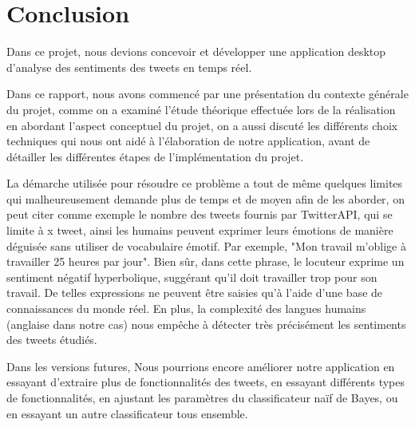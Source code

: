 \chapter{Conclusion}
Dans ce projet, nous devions concevoir et développer une application desktop d'analyse des sentiments des tweets en temps réel.

Dans ce rapport, nous avons commencé par une présentation du contexte générale du projet, comme on a examiné l'étude théorique effectuée lors de la réalisation en abordant l'aspect conceptuel du projet, on a aussi discuté les différents choix techniques qui nous ont aidé à l'élaboration de notre application, avant de détailler les différentes étapes de l'implémentation du projet.

La démarche utilisée pour résoudre ce problème a tout de même quelques limites qui malheureusement demande plus de temps et de moyen afin de les aborder, on peut citer comme exemple le nombre des tweets fournis par TwitterAPI, qui se limite à x tweet, ainsi les humains peuvent exprimer leurs émotions de manière déguisée sans utiliser de vocabulaire émotif. Par exemple, "Mon travail m'oblige à travailler 25 heures par jour". Bien sûr, dans cette phrase, le locuteur exprime un sentiment négatif hyperbolique, suggérant qu'il doit travailler trop pour son travail. De telles expressions ne peuvent être saisies qu'à l'aide d'une base de connaissances du monde réel. En plus, la complexité des langues humains (anglaise dans notre cas) nous empêche à détecter très précisément les sentiments des tweets étudiés.

Dans les versions futures, Nous pourrions encore améliorer notre application en essayant d'extraire plus de fonctionnalités des tweets, en essayant différents types de fonctionnalités, en ajustant les paramètres du classificateur naïf de Bayes, ou en essayant un autre classificateur tous ensemble.